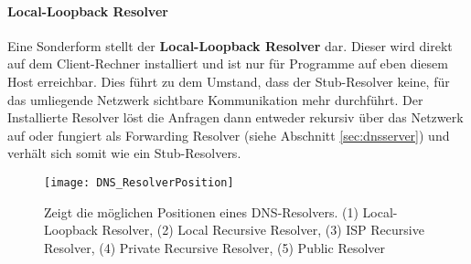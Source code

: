 \paragraph{Local-Loopback Resolver}
Eine Sonderform stellt der \textbf{Local-Loopback Resolver} dar. Dieser wird direkt auf dem Client-Rechner installiert und ist nur für Programme auf eben diesem Host erreichbar. Dies führt zu dem Umstand, dass der Stub-Resolver keine, für das umliegende Netzwerk sichtbare Kommunikation mehr durchführt. Der Installierte Resolver löst die Anfragen dann entweder rekursiv über das Netzwerk auf oder fungiert als Forwarding Resolver (siehe Abschnitt \ref{sec:dnsserver}) und verhält sich somit wie ein Stub-Resolvers.

\begin{figure}[htbp]
    \centering
    \texttt{[image: DNS\_ResolverPosition]}
    \caption{Zeigt die möglichen Positionen eines DNS-Resolvers. (1) Local-Loopback Resolver, (2) Local Recursive Resolver, (3) ISP Recursive Resolver, (4) Private Recursive Resolver, (5) Public Resolver}
    \label{img:dnsresolverposition}
\end{figure}
